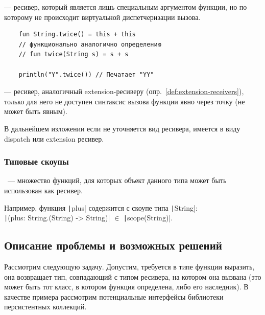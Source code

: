 \begin{definition}
    \label{def:extension-receivers}
     --- ресивер, который является лишь специальным аргументом функции, но по которому не происходит виртуальной диспетчеризации вызова.
\end{definition}

\begin{verbatim}
    fun String.twice() = this + this
    // функционально аналогично определению
    // fun twice(String s) = s + s

    println("Y".twice()) // Печатает "YY"
\end{verbatim}

\begin{definition}
    \label{def:context-receivers}
     --- ресивер, аналогичный extension-ресиверу (опр.~\ref{def:extension-receivers}), только для него не доступен синтаксис вызова функции явно через точку (не может быть явным).
\end{definition}

В дальнейшем изложении если не уточняется вид ресивера, имеется в виду dispatch или extension ресивер.

\subsubsection{Типовые скоупы}

\begin{definition}
    \label{def:type-scope}
    ~--- множество функций, для которых объект данного типа может быть использован как ресивер.
\end{definition}

Например, функция \texttt|plus| содержится с скоупе типа \texttt|String|: \\\texttt|(plus: String.(String) -> String)| $\in$ \texttt|scope(String)|.


\subsection{Описание проблемы и возможных решений}

Рассмотрим следующую задачу.
Допустим, требуется в типе функции выразить, она возвращает тип, совпадающий с типом ресивера, на котором она вызвана (это может быть тот класс, в котором функция определена, либо его наследник).
В качестве примера рассмотрим потенциальные интерфейсы библиотеки персистентных коллекций.

